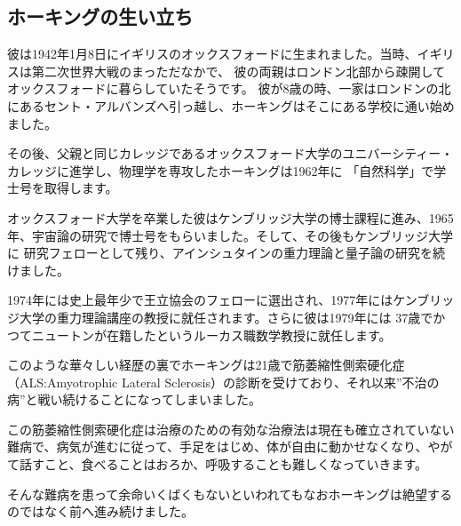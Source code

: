\documentclass[10pt,b5paper,papersize,dvipdfmx]{jsbook}
\begin{document}
\subsection{ホーキングの生い立ち}
彼は1942年1月8日にイギリスのオックスフォードに生まれました。当時、イギリスは第二次世界大戦のまっただなかで、
彼の両親はロンドン北部から疎開してオックスフォードに暮らしていたそうです。
彼が8歳の時、一家はロンドンの北にあるセント・アルバンズへ引っ越し、ホーキングはそこにある学校に通い始めました。\par
その後、父親と同じカレッジであるオックスフォード大学のユニバーシティー・カレッジに進学し、物理学を専攻したホーキングは1962年に
「自然科学」で学士号を取得します。\par
オックスフォード大学を卒業した彼はケンブリッジ大学の博士課程に進み、1965年、宇宙論の研究で博士号をもらいました。そして、その後もケンブリッジ大学に
研究フェローとして残り、アインシュタインの重力理論と量子論の研究を続けました。\par
1974年には史上最年少で王立協会のフェローに選出され、1977年にはケンブリッジ大学の重力理論講座の教授に就任されます。さらに彼は1979年には
37歳でかつてニュートンが在籍したというルーカス職数学教授に就任します。\par
このような華々しい経歴の裏でホーキングは21歳で筋萎縮性側索硬化症（ALS:Amyotrophic Lateral Sclerosis）の診断を受けており、それ以来”不治の病”と戦い続けることになってしまいました。\par
この筋萎縮性側索硬化症は治療のための有効な治療法は現在も確立されていない難病で、病気が進むに従って、手足をはじめ、体が自由に動かせなくなり、やがて話すこと、食べることはおろか、呼吸することも難しくなっていきます。\par
そんな難病を患って余命いくばくもないといわれてもなおホーキングは絶望するのではなく前へ進み続けました。
\newpage
\end{document}
